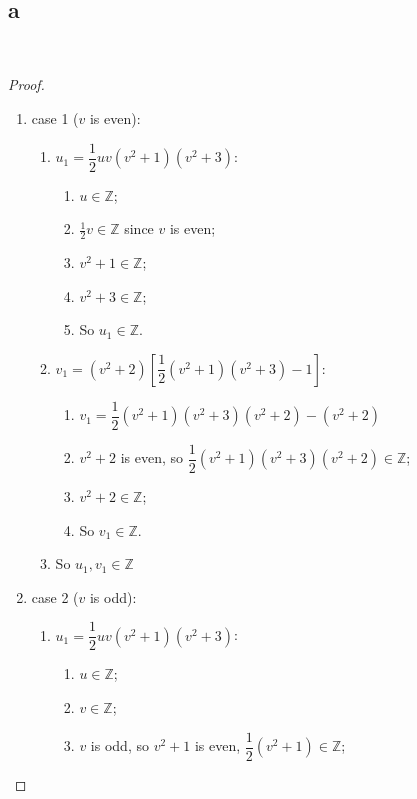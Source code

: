 \documentclass{article}
\begin{document}
~

\subsection*{a}

~

\begin{proof}
~
    \begin{enumerate}
        \item case 1 ($v$ is even):
        \begin{enumerate}
            \item $u_1=\dfrac{1}{2}uv(v^2+1)(v^2+3)$:
            \begin{enumerate}
                \item $u\in\mathbb{Z}$;
                \item $\frac{1}{2}v\in\mathbb{Z}$ since $v$ is even;
                \item $v^2+1\in\mathbb{Z}$;
                \item $v^2+3\in\mathbb{Z}$;
                \item So $u_1\in\mathbb{Z}$.
            \end{enumerate}
            \item $v_1=(v^2+2)\left[\dfrac{1}{2}(v^2+1)(v^2+3)-1\right]$:
            \begin{enumerate}
                \item $v_1=\dfrac{1}{2}(v^2+1)(v^2+3)(v^2+2)-(v^2+2)$
                \item $v^2+2$ is even, so $\dfrac{1}{2}(v^2+1)(v^2+3)(v^2+2)\in\mathbb{Z}$;
                \item $v^2+2\in\mathbb{Z}$;
                \item So $v_1\in\mathbb{Z}$.
            \end{enumerate}
            \item So $u_1,v_1\in\mathbb{Z}$
        \end{enumerate}
        \item case 2 ($v$ is odd):
        \begin{enumerate}
            \item $u_1=\dfrac{1}{2}uv(v^2+1)(v^2+3)$:
            \begin{enumerate}
                \item $u\in\mathbb{Z}$;
                \item $v\in\mathbb{Z}$;
                \item $v$ is odd, so $v^2+1$ is even, $\dfrac{1}{2}(v^2+1)\in\mathbb{Z}$;

\end{enumerate}
\end{enumerate}
\end{enumerate}
\end{proof}
\end{document}
